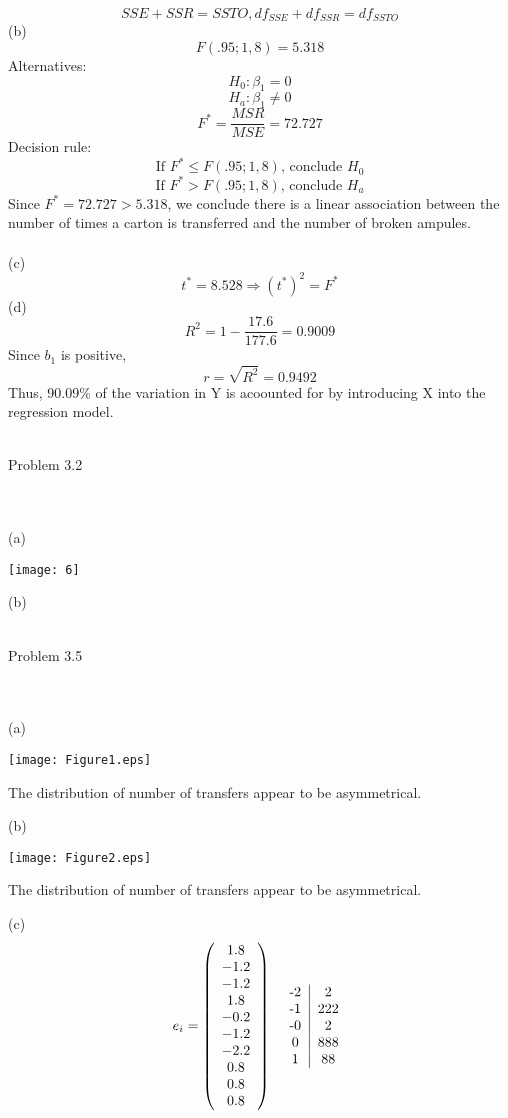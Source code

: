 \documentclass{article}
\begin{document}
\[SSE+SSR=SSTO, df_{SSE}+df_{SSR}=df_{SSTO}\]
(b)\[F(.95;1,8)=5.318\]
Alternatives:\[H_0:\beta_1=0\]
\[H_a:\beta_1\neq0\]
\[F^*=\frac{MSR}{MSE}=72.727\]
Decision rule:\[\text{If $F^*\leq F(.95;1,8)$, conclude $H_0$}\]
\[\text{If $F^*> F(.95;1,8)$, conclude $H_a$}\]
Since $F^*=72.727>5.318$, we conclude there is a linear association between the number of times a carton is transferred and the number of broken ampules.
\\\\(c)\[t^*=8.528\Rightarrow (t^*)^2=F^*\]
(d)\[R^2=1-\frac{17.6}{177.6}=0.9009\]
Since $b_1$ is positive,\[r=\sqrt{R^2}=0.9492\]
Thus, 90.09\% of the variation in Y is acoounted for by introducing X into the regression model.
\\\\\begin{large}Problem 3.2\end{large}
\\\\(a)   \begin{center}\texttt{[image: 6]}
   \end{center}
(b) \break  
\\\\\begin{large}Problem 3.5\end{large}
\\\\(a)
\begin{center}
   \texttt{[image: Figure1.eps]}
   \begin{center}The distribution of number of transfers appear to be asymmetrical.\end{center}\end{center}
(b)\begin{center}
   \texttt{[image: Figure2.eps]}
   \begin{center}The distribution of number of transfers appear to be asymmetrical.\end{center}\end{center}
(c)    \[e_i=\left(\begin{array}{c} 1.8\\ -1.2\\ -1.2\\ 1.8\\ -0.2\\ -1.2\\ -2.2\\ 0.8\\ 0.8\\ 0.8 \end{array}\right)\,\,\,\,
\begin{tabular}{c|c}
-2&2\\
-1&222\\
-0&2\\
0&888\\
1&88
\end{tabular}\]
\end{document}
